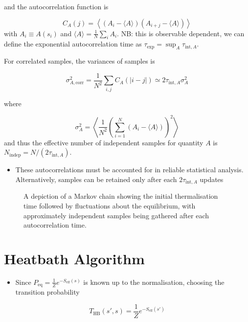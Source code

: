 and the autocorrelation function is

\begin{equation}
C_{A}(j)=\left\langle\left(A_{i}-\langle A\rangle\right)\left(A_{i+j}-\langle A\rangle\right)\right\rangle
\end{equation}
with $A_i \equiv A(s_i)$ and $\langle A \rangle = \frac{1}{N}\sum_i A_i$. NB: this is observable dependent, we can define the exponential autocorrelation time as $\tau_\text{exp} = \operatorname{sup}_A \tau_{\text{int},A}$.

For correlated samples, the variances of samples is

\begin{equation}
\sigma_{A, \text{corr}}^{2}=\frac{1}{N^{2}} \sum_{i, j} C_{A}(|i-j|) \simeq 2 \tau_{\text{int}, A} \sigma_{A}^{2}
\end{equation}

where

\begin{equation}
\sigma_{A}^{2}=\left\langle\frac{1}{N^{2}}\left(\sum_{i=1}^{N}\left(A_{i}-\langle A\rangle\right)\right)^{2}\right\rangle
\end{equation}
and thus the effective number of independent samples for quantity $A$ is $N_\text{indep} = N/(2 \tau_{\text{int},A})$.
\begin{itemize}
    \item These autocorrelations must be accounted for in reliable statistical analysis. Alternatively, samples can be retained only after each $2 \tau_{\text{int},A}$ updates
\end{itemize}

\begin{figure}
    \centering
    \caption{A depiction of a Markov chain showing the initial thermalisation time followed by fluctuations about the equilibrium, with approximately independent samples being gathered after each autocorrelation time.}
    \label{fig:markov_chain}
\end{figure}

\section{Heatbath Algorithm}
\begin{itemize}
    \item Since $P_\text{eq} = \frac{1}{Z}e^{-S_\text{eff}(s)}$ is known up to the normalisation, choosing the transition probability
\end{itemize}
\begin{equation}
    T_{\text{HB}}(s', s) = \frac{1}{Z} e^{-S_\text{eff}(s')}
\end{equation}

